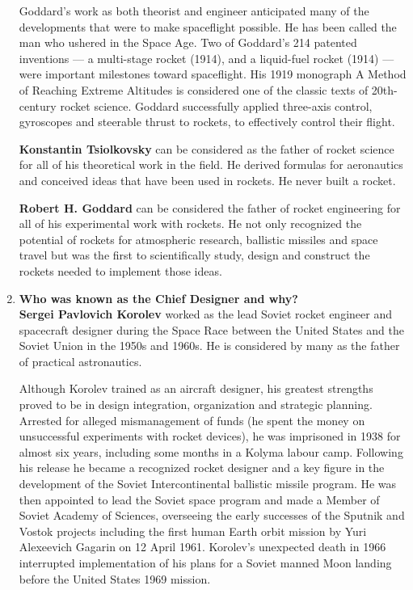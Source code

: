 \begin{enumerate}
Goddard's work as both theorist and engineer anticipated many of the developments that were to make spaceflight possible. He has been called the man who ushered in the Space Age. Two of Goddard's 214 patented inventions — a multi-stage rocket (1914), and a liquid-fuel rocket (1914) — were important milestones toward spaceflight. His 1919 monograph A Method of Reaching Extreme Altitudes is considered one of the classic texts of 20th-century rocket science. Goddard successfully applied three-axis control, gyroscopes and steerable thrust to rockets, to effectively control their flight. \cite{goddard}

{\bf Konstantin Tsiolkovsky} can be considered as the father of rocket science for all of his theoretical work in the field. He derived formulas for aeronautics and conceived ideas that have been used in rockets. He never built a rocket.

{\bf Robert H. Goddard} can be considered the father of rocket engineering for all of his experimental work with rockets. He not only recognized the potential of rockets for atmospheric research, ballistic missiles and space travel but was the first to scientifically study, design and construct the rockets needed to implement those ideas.

	\item {\bf Who was known as the Chief Designer and why?}\\
	
{\bf Sergei Pavlovich Korolev} worked as the lead Soviet rocket engineer and spacecraft designer during the Space Race between the United States and the Soviet Union in the 1950s and 1960s. He is considered by many as the father of practical astronautics.

Although Korolev trained as an aircraft designer, his greatest strengths proved to be in design integration, organization and strategic planning. Arrested for alleged mismanagement of funds (he spent the money on unsuccessful experiments with rocket devices), he was imprisoned in 1938 for almost six years, including some months in a Kolyma labour camp. Following his release he became a recognized rocket designer and a key figure in the development of the Soviet Intercontinental ballistic missile program. He was then appointed to lead the Soviet space program and made a Member of Soviet Academy of Sciences, overseeing the early successes of the Sputnik and Vostok projects including the first human Earth orbit mission by Yuri Alexeevich Gagarin on 12 April 1961. Korolev's unexpected death in 1966 interrupted implementation of his plans for a Soviet manned Moon landing before the United States 1969 mission.


\end{enumerate}
